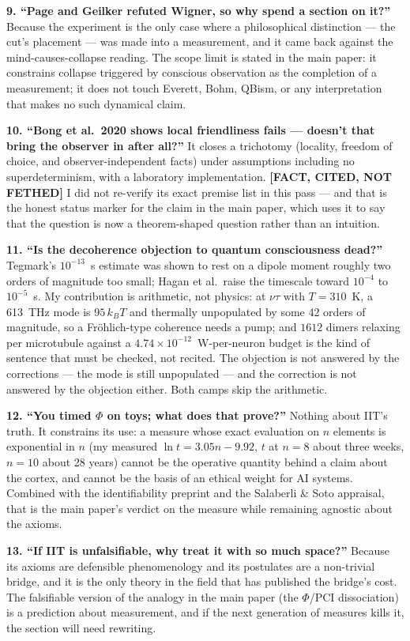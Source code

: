 \documentclass[11pt]{article}
\begin{document}
\textbf{9. ``Page and Geilker refuted Wigner, so why spend a section on it?''} Because the experiment
is the only case where a philosophical distinction --- the cut's placement --- was made into a
measurement, and it came back against the mind-causes-collapse reading. The scope limit is stated in
the main paper: it constrains collapse triggered by conscious observation as the completion of a
measurement; it does not touch Everett, Bohm, QBism, or any interpretation that makes no such dynamical
claim.

\textbf{10. ``Bong et al.\ 2020 shows local friendliness fails --- doesn't that bring the observer in
after all?''} It closes a trichotomy (locality, freedom of choice, and observer-independent facts) under
assumptions including no superdeterminism, with a laboratory implementation. \textbf{[FACT, CITED, NOT
FETHED]} I did not re-verify its exact premise list in this pass --- and that is the honest status
marker for the claim in the main paper, which uses it to say that the question is now a theorem-shaped
question rather than an intuition.

\textbf{11. ``Is the decoherence objection to quantum consciousness dead?''} Tegmark's $10^{-13}$~s
estimate was shown to rest on a dipole moment roughly two orders of magnitude too small; Hagan et al.\
raise the timescale toward $10^{-4}$ to $10^{-5}$~s. My contribution is arithmetic, not physics: at
$\nu\tau$ with $T=310$~K, a 613~THz mode is $95\,k_BT$ and thermally unpopulated by some 42 orders of
magnitude, so a Fr\"ohlich-type coherence needs a pump; and $1612$ dimers relaxing per microtubule
against a $4.74\times10^{-12}$~W-per-neuron budget is the kind of sentence that must be checked, not
recited. The objection is not answered by the corrections --- the mode is still unpopulated --- and the
correction is not answered by the objection either. Both camps skip the arithmetic.

\textbf{12. ``You timed $\Phi$ on toys; what does that prove?''} Nothing about IIT's truth. It
constrains its use: a measure whose exact evaluation on $n$ elements is exponential in $n$ (my
measured $\ln t = 3.05n - 9.92$, $t$ at $n=8$ about three weeks, $n=10$ about 28 years) cannot be the
operative quantity behind a claim about the cortex, and cannot be the basis of an ethical weight for
AI systems. Combined with the identifiability preprint and the Salaberli \& Soto appraisal, that is the
main paper's verdict on the measure while remaining agnostic about the axioms.

\textbf{13. ``If IIT is unfalsifiable, why treat it with so much space?''} Because its axioms are
defensible phenomenology and its postulates are a non-trivial bridge, and it is the only theory in the
field that has published the bridge's cost. The falsifiable version of the analogy in the main paper
(the $\Phi$/PCI dissociation) is a prediction about measurement, and if the next generation of
measures kills it, the section will need rewriting.
\end{document}
